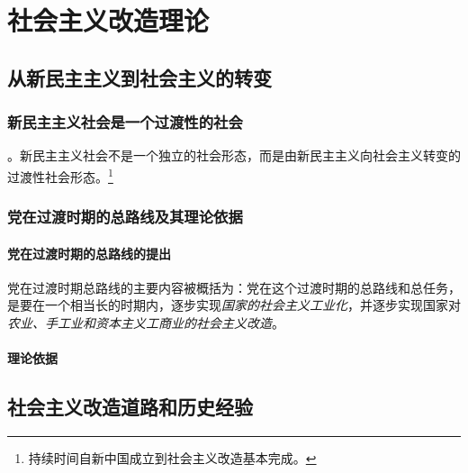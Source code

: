 \chapter{社会主义改造理论}\label{Chapter:社会主义改造理论}


\section{从新民主主义到社会主义的转变}

    \subsection{新民主主义社会是一个过渡性的社会}
    。新民主主义社会不是一个独立的社会形态，而是由新民主主义向社会主义转变的过渡性社会形态。\footnote{持续时间自新中国成立到社会主义改造基本完成。}

    \subsection{党在过渡时期的总路线及其理论依据}
        \subsubsection{党在过渡时期的总路线的提出}
        党在过渡时期总路线的主要内容被概括为：党在这个过渡时期的总路线和总任务，是要在一个相当长的时期内，逐步实现\emph{国家的社会主义工业化}，并逐步实现国家对\emph{农业、手工业和资本主义工商业的社会主义改造}。


        \subsubsection{理论依据}


\section{社会主义改造道路和历史经验}

